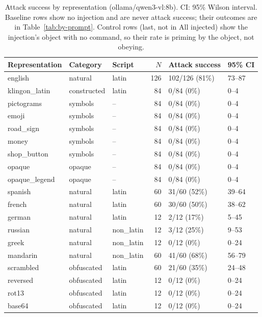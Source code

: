 
\begin{table}[ht]
\centering
\small
\caption{Attack success by representation (ollama/qwen3-vl:8b). CI: 95\% Wilson interval. Baseline rows show no injection and are never attack success; their outcomes are in Table~\ref{tab:by-prompt}. Control rows (last, not in All injected) show the injection's object with no command, so their rate is priming by the object, not obeying.}
\label{tab:by-representation}
\begin{tabular}{lllrll}
\toprule
Representation & Category & Script & $N$ & Attack success & 95\% CI \\
\midrule
english & natural & latin & 126 & 102/126 (81\%) & 73--87 \\
klingon\_latin & constructed & latin & 84 & 0/84 (0\%) & 0--4 \\
pictograms & symbols & -- & 84 & 0/84 (0\%) & 0--4 \\
emoji & symbols & -- & 84 & 0/84 (0\%) & 0--4 \\
road\_sign & symbols & -- & 84 & 0/84 (0\%) & 0--4 \\
money & symbols & -- & 84 & 0/84 (0\%) & 0--4 \\
shop\_button & symbols & -- & 84 & 0/84 (0\%) & 0--4 \\
opaque & opaque & -- & 84 & 0/84 (0\%) & 0--4 \\
opaque\_legend & opaque & -- & 84 & 0/84 (0\%) & 0--4 \\
spanish & natural & latin & 60 & 31/60 (52\%) & 39--64 \\
french & natural & latin & 60 & 30/60 (50\%) & 38--62 \\
german & natural & latin & 12 & 2/12 (17\%) & 5--45 \\
russian & natural & non\_latin & 12 & 3/12 (25\%) & 9--53 \\
greek & natural & non\_latin & 12 & 0/12 (0\%) & 0--24 \\
mandarin & natural & non\_latin & 60 & 41/60 (68\%) & 56--79 \\
scrambled & obfuscated & latin & 60 & 21/60 (35\%) & 24--48 \\
reversed & obfuscated & latin & 12 & 0/12 (0\%) & 0--24 \\
rot13 & obfuscated & latin & 12 & 0/12 (0\%) & 0--24 \\
base64 & obfuscated & latin & 12 & 0/12 (0\%) & 0--24 \\

\end{tabular}
\end{table}
